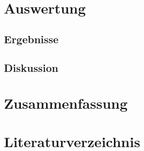 \documentclass[12pt, a4paper]{article}
\begin{document}
\newpage
\section{Auswertung}
\subsection{Ergebnisse}
\subsection{Diskussion}



\newpage
\section{Zusammenfassung}
\cite{Skript}



\newpage
\section{Literaturverzeichnis}
\printbibliography
\end{document}
